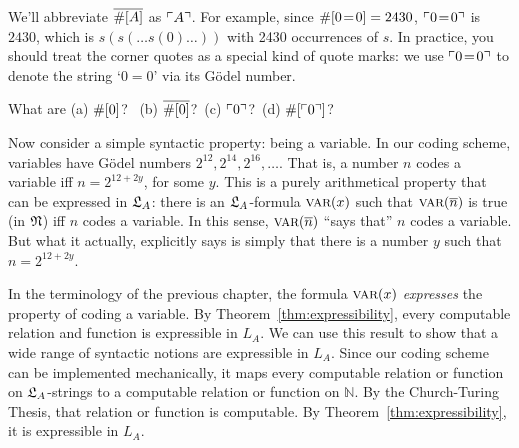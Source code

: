 We'll abbreviate $\overline{\#[A]}$ as $\ulcorner A \urcorner$.
For example,
since $\#[0\!=\!0] = 2430$,
$\ulcorner 0\!=\!0 \urcorner$ is $\num{2430}$,
which is $s(s(\ldots s(0)\ldots))$ with 2430 occurrences of $s$.
In practice,
you should treat the corner quotes as a special kind of quote marks:
we use $\ulcorner 0\!=\!0 \urcorner$ to denote the string `$0\!=\!0$' via its Gödel number.

\begin{exercise}
  What are (a) $\#[0]$? \, (b) $\overline{\#[0]}$?\, (c) $\ulcorner 0 \urcorner$?\, (d) $\#[\ulcorner 0 \urcorner]$?
\end{exercise}

Now consider a simple syntactic property: being a variable.
In our coding scheme,
variables have Gödel numbers  $2^{12}, 2^{14}, 2^{16}, \ldots$.
That is,
a number $n$ codes a variable iff
$n = 2^{12 + 2y}$, for some $y$.
This is a purely arithmetical property that can be expressed in $\mathfrak{L}_A$:
there is an $\mathfrak{L}_A$-formula $\smallcaps{Var}(x)$
such that $\smallcaps{Var}(\num{n})$ is true (in $\mathfrak{N}$) iff $n$ codes a variable.
In this sense,
$\smallcaps{Var}(\num{n})$ ``says that'' $n$ codes a variable.
But what it actually, explicitly says is simply
that there is a number $y$ such that $n = 2^{12 + 2y}$.



In the terminology of the previous chapter,
the formula $\smallcaps{Var}(x)$
\emph{expresses} the property of coding a variable.
By Theorem~\ref{thm:expressibility},
every computable relation and function is expressible in $L_A$.
We can use this result 
to show that a wide range of syntactic notions are expressible in $L_A$.
Since our coding scheme can be implemented mechanically,
it maps every computable relation or function on $\mathfrak{L}_A$-strings
to a computable relation or function on $\mathbb{N}$.
By the Church-Turing Thesis,
that relation or function is computable.
By Theorem~\ref{thm:expressibility},
it is expressible in $L_A$.


